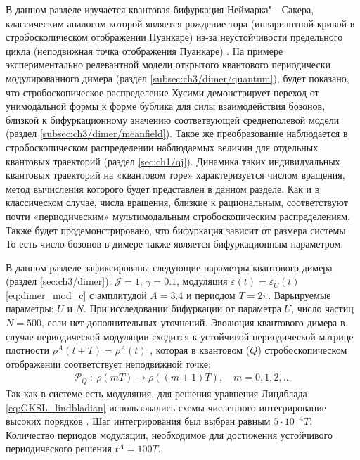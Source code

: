 В данном разделе изучается квантовая бифуркация Неймарка"--~Сакера, классическим аналогом которой является рождение тора (инвариантной кривой в стробоскопическом отображении Пуанкаре) из-за неустойчивости предельного цикла (неподвижная точка отображения Пуанкаре) \cite{Kuznetsov2004}.
На примере экспериментально релевантной модели открытого квантового периодически модулированного димера (раздел \cref{subsec:ch3/dimer/quantum}), будет показано, что стробоскопическое распределение Хусими \cite{Stockmann2006} демонстрирует переход от унимодальной формы к форме бублика для силы взаимодействия бозонов, близкой к бифуркационному значению соответвующей среднеполевой модели (раздел \cref{subsec:ch3/dimer/meanfield}). 
Такое же преобразование наблюдается в стробоскопическом распределении наблюдаемых величин для отдельных квантовых траекторий (раздел \cref{sec:ch1/qj}). 
Динамика таких индивидуальных квантовых траекторий на «квантовом торе» характеризуется числом вращения, метод вычисления которого будет представлен в данном разделе. 
Как и в классическом случае, числа вращения, близкие к рациональным, соответствуют почти «периодическим» мультимодальным стробоскопическим распределениям. 
Также будет продемонстрировано, что бифуркация зависит от размера системы. То есть число бозонов в димере также является бифуркационным параметром.

В данном разделе зафиксированы следующие параметры квантового димера (раздел \cref{sec:ch3/dimer}): \(\mathcal{J}=1\), \(\gamma=0.1\), модуляция \(\varepsilon(t)=\varepsilon_{C}(t)\) \cref{eq:dimer_mod_c} с амплитудой \(A=3.4\) и периодом \(T=2\pi\).
Варьируемые параметры: \(U\) и \(N\).
При исследовании бифуркации от параметра \(U\), число частиц \(N=500\), если нет дополнительных уточнений.
Эволюция квантового димера в случае периодической модуляции сходится к устойчивой периодической матрице плотности \(\rho^A(t + T) = \rho^A(t)\) \cite{Meyer1977}, которая в квантовом (\(Q\)) стробоскопическом отображении соответствует неподвижной точке:
\begin{equation}
	\label{eq:dimer_stroboscopic_q}
	\begin{gathered}
		\mathcal{P}_Q~:~\rho(mT) \to \rho((m+1)T), \quad m=0, 1, 2, \ldots
	\end{gathered}
\end{equation}
Так как в системе есть модуляция, для решения уравнения Линдблада \cref{eq:GKSL_lindbladian}
использовались схемы численного интегрирование высоких порядков \cite{Lambert1991}.
Шаг интегрирования был выбран равным $5\cdot10^{-4}T$.
Количество периодов модуляции, необходимое для достижения устойчивого периодического решения \(t^A = 100T\).

